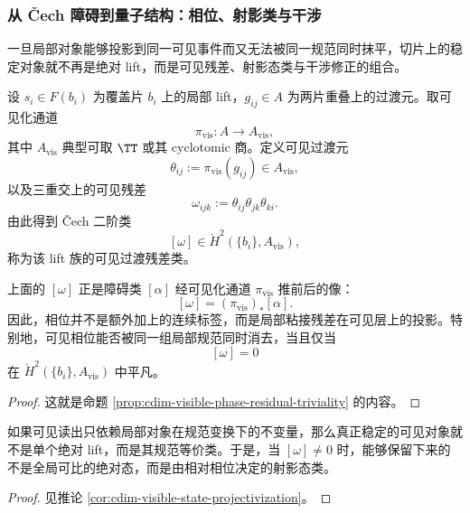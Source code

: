 \subsubsection{从 Čech 障碍到量子结构：相位、射影类与干涉}\label{subsubsec:typed-address-biaxial-completion-projective-phase}
一旦局部对象能够投影到同一可见事件而又无法被同一规范同时抹平，切片上的稳定对象就不再是绝对 lift，而是可见残差、射影态类与干涉修正的组合。

\begin{definition}[可见过渡残差类]\label{def:typed-address-biaxial-completion-visible-residual}
设 \(s_i\in F(b_i)\) 为覆盖片 \(b_i\) 上的局部 lift，\(g_{ij}\in A\) 为两片重叠上的过渡元。取可见化通道
\[
\pi_{\mathrm{vis}}:A\to A_{\mathrm{vis}},
\]
其中 \(A_{\mathrm{vis}}\) 典型可取 \(\TT\) 或其 cyclotomic 商。定义可见过渡元
\[
\theta_{ij}:=\pi_{\mathrm{vis}}(g_{ij})\in A_{\mathrm{vis}},
\]
以及三重交上的可见残差
\[
\omega_{ijk}:=\theta_{ij}\theta_{jk}\theta_{ki}.
\]
由此得到 Čech 二阶类
\[
[\omega]\in \check H^2(\{b_i\},A_{\mathrm{vis}}),
\]
称为该 lift 族的可见过渡残差类。
\end{definition}

\begin{proposition}[相位是粘接残差的可见投影]\label{prop:typed-address-biaxial-completion-phase-residual}
上面的 \([\omega]\) 正是障碍类 \([\alpha]\) 经可见化通道 \(\pi_{\mathrm{vis}}\) 推前后的像：
\[
[\omega]=(\pi_{\mathrm{vis}})_*[\alpha].
\]
因此，相位并不是额外加上的连续标签，而是局部粘接残差在可见层上的投影。特别地，可见相位能否被同一组局部规范同时消去，当且仅当
\[
[\omega]=0
\]
在 \(\check H^2(\{b_i\},A_{\mathrm{vis}})\) 中平凡。
\end{proposition}
\begin{proof}
这就是命题 \ref{prop:cdim-visible-phase-residual-triviality} 的内容。
\end{proof}

\begin{corollary}[可见态首先是射影类]\label{cor:typed-address-biaxial-completion-projective-class}
如果可见读出只依赖局部对象在规范变换下的不变量，那么真正稳定的可见对象就不是单个绝对 lift，而是其规范等价类。于是，当 \([\omega]\neq 0\) 时，能够保留下来的不是全局可比的绝对态，而是由相对相位决定的射影态类。
\end{corollary}
\begin{proof}
见推论 \ref{cor:cdim-visible-state-projectivization}。
\end{proof}

